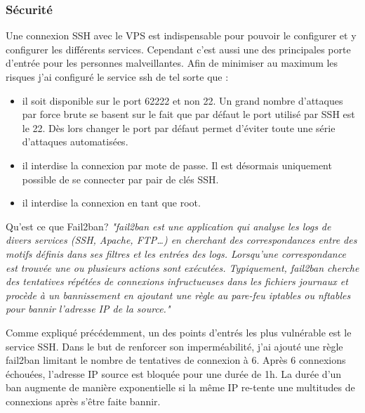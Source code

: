 \subsubsection{Sécurité}
\newparasm
Une connexion SSH avec le VPS est indispensable pour pouvoir le configurer et y configurer les différents services. Cependant c'est aussi une des principales porte d'entrée pour les personnes malveillantes. Afin de minimiser au maximum les risques j'ai configuré le service ssh de tel sorte que :
\begin{itemize}
  \item il soit disponible sur le port 62222 et non 22. Un grand nombre d'attaques par force brute se basent sur le fait que par défaut le port utilisé par SSH est le 22. Dès lors changer le port par défaut permet d'éviter toute une série d'attaques automatisées. 
  \item il interdise la connexion par mote de passe. Il est désormais uniquement possible de se connecter par pair de clés SSH.
  \item il interdise la connexion en tant que root. 
\end{itemize} 

\newparasm
Qu'est ce que Fail2ban? \textit{"fail2ban est une application qui analyse les logs de divers services (SSH, Apache, FTP…) en cherchant des correspondances entre des motifs définis dans ses filtres et les entrées des logs. Lorsqu'une correspondance est trouvée une ou plusieurs actions sont exécutées. Typiquement, fail2ban cherche des tentatives répétées de connexions infructueuses dans les fichiers journaux et procède à un bannissement en ajoutant une règle au pare-feu iptables ou nftables pour bannir l'adresse IP de la source."}\cite{F2B}

\newpara

Comme expliqué précédemment, un des points d'entrés les plus vulnérable est le service SSH. Dans le but de renforcer son imperméabilité, j'ai ajouté une règle fail2ban limitant le nombre de tentatives de connexion à 6. Après 6 connexions échouées, l'adresse IP source est bloquée pour une durée de 1h. La durée d'un ban augmente de manière exponentielle si la même IP re-tente une multitudes de connexions après s'être faite bannir. 

\newpage

